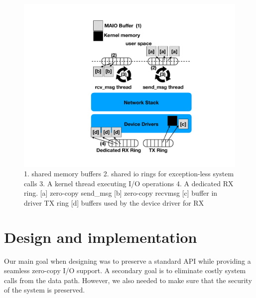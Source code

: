 \begin{figure}[t]
    \centering
    \includegraphics[width=0.8\columnwidth]{ktcp_z.pdf}
    \caption{1. \oursys shared memory buffers 2. shared io rings for exception-less system calls 3. A kernel thread executing I/O operations 4. A dedicated RX ring.
    [a] zero-copy send\_msg [b] zero-copy recvmsg [c] \oursys buffer in driver TX ring [d] \oursys buffers used by the device driver for RX}
    \label{fig:our_sys}
\end{figure} 

\section{Design and implementation}\label{sec:design}
Our main goal when designing \oursys was to preserve a standard \sockets API while providing a seamless zero-copy I/O support. A secondary goal is to eliminate costly system calls from the data path. However, we also needed to make sure that the security of the system is preserved.



